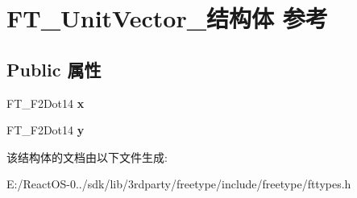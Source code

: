\hypertarget{struct_f_t___unit_vector__}{}\section{F\+T\+\_\+\+Unit\+Vector\+\_\+结构体 参考}
\label{struct_f_t___unit_vector__}
\subsection*{Public 属性}
\begin{DoxyCompactItemize}
\item 
\mbox{\label{struct_f_t___unit_vector___a03c9f8ae35a5ad1bcac49995a9dac714}} 
F\+T\+\_\+\+F2\+Dot14 {\bfseries x}
\item 
\mbox{\label{struct_f_t___unit_vector___a12eb9ad5c47614f5f2d3f9e401933d0e}} 
F\+T\+\_\+\+F2\+Dot14 {\bfseries y}
\end{DoxyCompactItemize}


该结构体的文档由以下文件生成\+:\begin{DoxyCompactItemize}
\item 
E\+:/\+React\+O\+S-\/0../sdk/lib/3rdparty/freetype/include/freetype/fttypes.\+h\end{DoxyCompactItemize}
